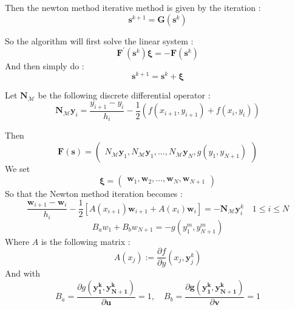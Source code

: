 \documentclass[10pt,a4paper,twocolumn]{article}
\begin{document}
Then the newton method iterative method is given by the iteration : 
\[\textbf{s}^{k+1} =  \textbf{G}(\textbf{s}^k) \]

So the algorithm will first solve the linear system : 
\begin{equation}
\mathbf{F}^{\prime}\left(\mathbf{s}^{k}\right) \boldsymbol{\xi}=-\mathbf{F}\left(\mathbf{s}^{k}\right)
\end{equation} 
And then simply do : 
\begin{equation}
\textbf{s}^{k+1} = \textbf{s}^{k} + \boldsymbol{\xi}
\end{equation} 

Let $\textbf{N}_{\mathcal{M}}$ be the following discrete differential operator : 
\[ \textbf{N}_{\mathcal{M}} \textbf{y}_i = \frac{y_{i+1}-y_{i}}{h_{i}}-\frac{1}{2}\left(f\left(x_{i+1}, y_{i+1}\right)+f\left(x_{i}, y_{i}\right)\right) \]

Then \[ \textbf{F}(\textbf{s}) = \begin{pmatrix}
N_{\mathcal{M}}\textbf{y}_1,
N_{\mathcal{M}}\textbf{y}_1,
\dots, 
N_{\mathcal{M}}\textbf{y}_N,
g(y_1, y_{N+1})
\end{pmatrix}
 \] 
We set
\[  \boldsymbol{\xi} = \begin{pmatrix}
\textbf{w}_1 ,
\textbf{w}_2 ,
\dots ,
\textbf{w}_N ,
\textbf{w}_{N+1}
\end{pmatrix}
\]
So that the Newton method iteration becomes : 
\begin{equation}
\frac{\mathbf{w}_{i+1}-\mathbf{w}_{i}}{h_{i}}-\frac{1}{2}\left[A\left(x_{i+1}\right) \mathbf{w}_{i+1}+A\left(x_{i}\right) \mathbf{w}_{i}\right]=-\mathbf{N}_{\mathcal{M}} \mathbf{y}_{i}^{k	} \quad 1 \leq i \leq N
\end{equation}
\begin{equation}
B_{a} w_{1}+B_{b} w_{N+1}=-g\left(y_{1}^{m}, y_{N+1}^{m}\right)
\end{equation}
Where $A$ is the following matrix : 
$$
A\left(x_{j}\right):=\frac{\partial f}{\partial y}\left(x_{j},{\mathbf{y}}_{j}^{k}\right)
$$
And with $$
B_{a}=\frac{\partial g(\mathbf{y_1^k}, \mathbf{y_{N+1}^k})}{\partial \mathbf{u}} = 1, \quad B_{b}=\frac{\partial \mathbf{g}(\mathbf{y_1^k}, \mathbf{y_{N+1}^k})}{\partial \mathbf{v}} = 1
$$
\end{document}
